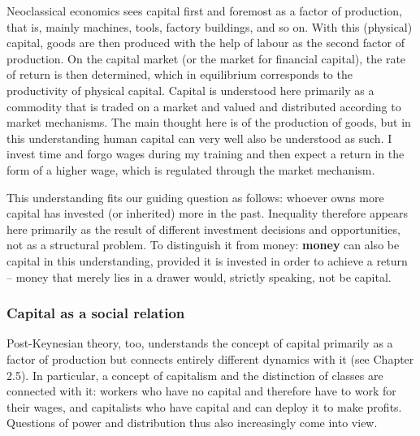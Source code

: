 \documentclass[
  british,
  a4paper,
  DIV=11,
  numbers=noendperiod,
  oneside,
  openany]{scrreprt}
\begin{document}
Neoclassical economics sees capital first and foremost as a factor of
production, that is, mainly machines, tools, factory buildings, and so
on. With this (physical) capital, goods are then produced with the help
of labour as the second factor of production. On the capital market (or
the market for financial capital), the rate of return is then
determined, which in equilibrium corresponds to the productivity of
physical capital. Capital is understood here primarily as a commodity
that is traded on a market and valued and distributed according to
market mechanisms. The main thought here is of the production of goods,
but in this understanding human capital can very well also be understood
as such. I invest time and forgo wages during my training and then
expect a return in the form of a higher wage, which is regulated through
the market mechanism.

This understanding fits our guiding question as follows: whoever owns
more capital has invested (or inherited) more in the past. Inequality
therefore appears here primarily as the result of different investment
decisions and opportunities, not as a structural problem. To distinguish
it from money: \textbf{money} can also be capital in this understanding,
provided it is invested in order to achieve a return -- money that
merely lies in a drawer would, strictly speaking, not be capital.

\subsubsection{Capital as a social
relation}\label{capital-as-a-social-relation}

Post-Keynesian theory, too, understands the concept of capital primarily
as a factor of production but connects entirely different dynamics with
it (see Chapter 2.5). In particular, a concept of capitalism and the
distinction of classes are connected with it: workers who have no
capital and therefore have to work for their wages, and capitalists who
have capital and can deploy it to make profits. Questions of power and
distribution thus also increasingly come into view.
\end{document}
